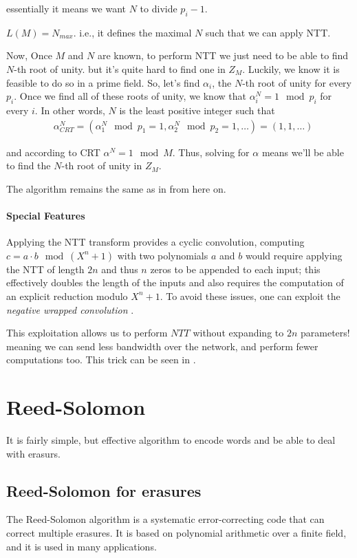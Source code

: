 essentially it means we want $ N$ to divide $p_i-1$.

\begin{corollary}
  $L(M)=N_{max}$. i.e., it defines the maximal $N$ 
  such that we can apply NTT.  
\end{corollary}

Now, Once $M$ and $N$ are known, to perform NTT we just need to be able to find 
$N$-th root of unity. but it's quite hard to find one in $Z_M$.
Luckily, we know it is feasible to do so in a prime field. 
So, let's find $\alpha_i$, the $N$-th root of unity for every $p_i$.
Once we find all of these roots of unity, we know that $\alpha_i^N=1 \mod p_i$ for every $i$.
In other words, $N$ is the least positive integer such that
\begin{align*}
  &\alpha_{CRT}^N = (\alpha_1^N \mod p_1=1, \alpha_2^N \mod p_2=1,\dots)= (1,1,\dots)
\end{align*}

and according to CRT $\alpha^N=1 \mod M$. Thus, solving for $\alpha$ 
means we'll be able to find the $N$-th root of unity in $Z_M$.

The algorithm remains the same as in  from here on.

\paragraph{Special Features}
Applying the NTT transform provides a cyclic convolution, computing 
$c = a \cdot b \mod (X^n + 1)$  with two polynomials $a$ and $b$ would require 
applying the NTT of length $2n$ and thus $n$ zeros to be appended to each input;
this effectively doubles the length of the inputs and also requires the computation of 
an explicit reduction modulo $X^n +1$. 
To avoid these issues, one can exploit the \emph{negative wrapped convolution} \cite{negantt}.

This exploitation allows us to perform $NTT$ without expanding to $2n$ parameters!
meaning we can send less bandwidth over the network, and perform fewer computations too. 
This trick can be seen in \cite{SEAL}.

\section{Reed-Solomon}
It is fairly simple, but effective algorithm to encode words and be able to deal with erasurs.
\subsection{Reed-Solomon for erasures}
The Reed-Solomon algorithm is a systematic error-correcting code that can correct multiple erasures.
It is based on polynomial arithmetic over a finite field, and it is used in many applications.


